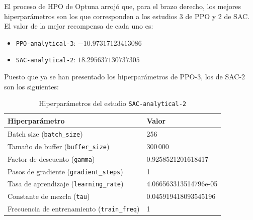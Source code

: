 El proceso de HPO de Optuna arrojó que, para el brazo derecho, los mejores hiperparámetros son los que corresponden a los estudios 3 de PPO y 2 de SAC. El valor de la mejor recompensa de cada uno es:

\begin{itemize}
	\item \texttt{PPO-analytical-3}: $-10.97317123413086$
	\item \texttt{SAC-analytical-2}: $18.295637130737305$\\
\end{itemize}

Puesto que ya se han presentado los hiperparámetros de PPO-3, los de SAC-2 son los siguientes:


\begin{table}[h!]
	\centering
	\caption{Hiperparámetros del estudio \texttt{SAC-analytical-2}}
	\begin{tabular}{|l|l|}
		\hline
		\textbf{Hiperparámetro} & \textbf{Valor} \\
		\hline
		Batch size (\texttt{batch\_size})        & 256 \\
		Tamaño de buffer (\texttt{buffer\_size}) & 300\,000 \\
		Factor de descuento (\texttt{gamma})     & 0.9258521201618417 \\
		Pasos de gradiente (\texttt{gradient\_steps}) & 1 \\
		Tasa de aprendizaje (\texttt{learning\_rate}) & 4.066563313514796e-05 \\
		Constante de mezcla (\texttt{tau})       & 0.045919418093545196 \\
		Frecuencia de entrenamiento (\texttt{train\_freq}) & 1 \\
		\hline
	\end{tabular}
	\label{tab:sac-analytical-2}
\end{table}
